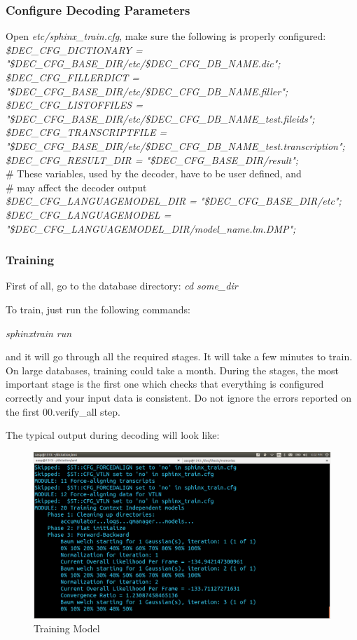 \documentclass[12pt,a4paper,oldfontcommands]{memoir}
\begin{document}
\subsubsection{Configure Decoding Parameters}
Open \textit{etc/sphinx\_train.cfg}, make sure the following is properly configured:\\
\textit{
\$DEC\_CFG\_DICTIONARY     = "\$DEC\_CFG\_BASE\_DIR/etc/\$DEC\_CFG\_DB\_NAME.dic";
}\\
\textit{\$DEC\_CFG\_FILLERDICT     = "\$DEC\_CFG\_BASE\_DIR/etc/\$DEC\_CFG\_DB\_NAME.filler";}
\textit{\$DEC\_CFG\_LISTOFFILES    = "\$DEC\_CFG\_BASE\_DIR/etc/\${DEC\_CFG\_DB\_NAME}\_test.fileids";}
\textit{\$DEC\_CFG\_TRANSCRIPTFILE = "\$DEC\_CFG\_BASE\_DIR/etc/\${DEC\_CFG\_DB\_NAME}\_test.transcription";}\\
\textit{\$DEC\_CFG\_RESULT\_DIR     = "\$DEC\_CFG\_BASE\_DIR/result";}\\
\# These variables, used by the decoder, have to be user defined, and\\
\# may affect the decoder output\\
\textit{\$DEC\_CFG\_LANGUAGEMODEL\_DIR = "\$DEC\_CFG\_BASE\_DIR/etc";}\\
\textit{\$DEC\_CFG\_LANGUAGEMODEL  = "\$DEC\_CFG\_LANGUAGEMODEL\_DIR/model\_name.lm.DMP";}

\subsubsection{Training}
 First of all, go to the database directory: 
\textit{cd some\_dir}

To train, just run the following commands: 

\textit{sphinxtrain run}

and it will go through all the required stages. It will take a few minutes to train. On large databases, training could take a month.
During the stages, the most important stage is the first one which checks that everything is configured correctly and your input data is consistent. Do not ignore the errors reported on the first 00.verify\_all step.

 The typical output during decoding will look like: 

\begin{figure}[h]
    \centering
    \includegraphics[scale=0.3]{Screenshot3}
    \caption{Training Model}
\end{figure}
\end{document}
